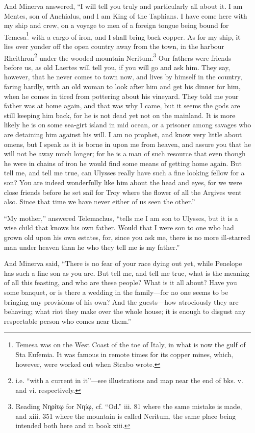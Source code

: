 And Minerva answered, “I will tell you truly and particularly all about it. I
am Mentes, son of Anchialus, and I am King of the Taphians. I have come here
with my ship and crew, on a voyage to men of a foreign tongue being bound for
Temesa\footnote{Temesa was on the West Coast of the toe of Italy, in what is now the gulf of
Sta Eufemia. It was famous in remote times for its copper mines, which,
however, were worked out when Strabo wrote.} with a
cargo of iron, and I shall bring back copper. As for my ship, it lies over
yonder off the open country away from the town, in the harbour Rheithron\footnote{i.e. “with a current in it”—see illustrations and map near the end of bks.
v. and vi. respectively.} under the wooded
mountain Neritum.\footnote{Reading Νηρίτῳ for
Νηίῳ, cf. “Od.” iii. 81 where the same mistake is made,
and xiii. 351 where the mountain is called Neritum, the same place being
intended both here and in book xiii.}
Our fathers were friends before us, as old Laertes will tell you, if you will
go and ask him. They say, however, that he never comes to town now, and lives
by himself in the country, faring hardly, with an old woman to look after him
and get his dinner for him, when he comes in tired from pottering about his
vineyard. They told me your father was at home again, and that was why I came,
but it seems the gods are still keeping him back, for he is not dead yet not on
the mainland. It is more likely he is on some sea-girt island in mid ocean, or
a prisoner among savages who are detaining him against his will. I am no
prophet, and know very little about omens, but I speak as it is borne in upon
me from heaven, and assure you that he will not be away much longer; for he is
a man of such resource that even though he were in chains of iron he would find
some means of getting home again. But tell me, and tell me true, can Ulysses
really have such a fine looking fellow for a son? You are indeed wonderfully
like him about the head and eyes, for we were close friends before he set sail
for Troy where the flower of all the Argives went also. Since that time we have
never either of us seen the other.”

“My mother,” answered Telemachus, “tells me I am son to Ulysses, but it is a
wise child that knows his own father. Would that I were son to one who had
grown old upon his own estates, for, since you ask me, there is no more
ill-starred man under heaven than he who they tell me is my father.”

And Minerva said, “There is no fear of your race dying out yet, while Penelope
has such a fine son as you are. But tell me, and tell me true, what is the
meaning of all this feasting, and who are these people? What is it all about?
Have you some banquet, or is there a wedding in the family—for no one seems to
be bringing any provisions of his own? And the guests—how atrociously they are
behaving; what riot they make over the whole house; it is enough to disgust any
respectable person who comes near them.”

